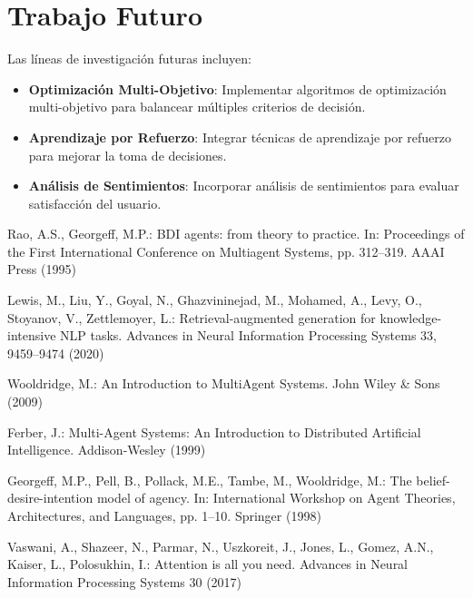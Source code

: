 \documentclass[runningheads,a4paper]{llncs}
\begin{document}
\section{Trabajo Futuro}

Las líneas de investigación futuras incluyen:

\begin{itemize}
    \item \textbf{Optimización Multi-Objetivo}: Implementar algoritmos de optimización multi-objetivo para balancear 
    múltiples criterios de decisión.
    \item \textbf{Aprendizaje por Refuerzo}: Integrar técnicas de aprendizaje por refuerzo para mejorar la toma de 
    decisiones.
    \item \textbf{Análisis de Sentimientos}: Incorporar análisis de sentimientos para evaluar satisfacción del usuario.
\end{itemize}

\begin{thebibliography}{8}

Rao, A.S., Georgeff, M.P.:
BDI agents: from theory to practice.
In: Proceedings of the First International Conference on Multiagent Systems, pp. 312--319. AAAI Press (1995)

Lewis, M., Liu, Y., Goyal, N., Ghazvininejad, M., Mohamed, A., Levy, O., Stoyanov, V., Zettlemoyer, L.:
Retrieval-augmented generation for knowledge-intensive NLP tasks.
Advances in Neural Information Processing Systems 33, 9459--9474 (2020)

Wooldridge, M.:
An Introduction to MultiAgent Systems.
John Wiley \& Sons (2009)

Ferber, J.:
Multi-Agent Systems: An Introduction to Distributed Artificial Intelligence.
Addison-Wesley (1999)

Georgeff, M.P., Pell, B., Pollack, M.E., Tambe, M., Wooldridge, M.:
The belief-desire-intention model of agency.
In: International Workshop on Agent Theories, Architectures, and Languages, pp. 1--10. Springer (1998)

Vaswani, A., Shazeer, N., Parmar, N., Uszkoreit, J., Jones, L., Gomez, A.N., Kaiser, L., Polosukhin, I.:
Attention is all you need.
Advances in Neural Information Processing Systems 30 (2017)

\end{thebibliography}
\end{document}
